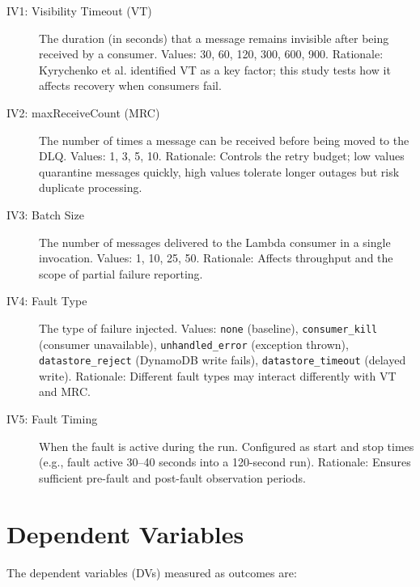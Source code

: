 \begin{description}
    \item[IV1: Visibility Timeout (VT)] The duration (in seconds) that a message remains invisible after being received by a consumer. Values: 30, 60, 120, 300, 600, 900. Rationale: Kyrychenko et al. identified VT as a key factor; this study tests how it affects recovery when consumers fail.
    
    \item[IV2: maxReceiveCount (MRC)] The number of times a message can be received before being moved to the DLQ. Values: 1, 3, 5, 10. Rationale: Controls the retry budget; low values quarantine messages quickly, high values tolerate longer outages but risk duplicate processing.
    
    \item[IV3: Batch Size] The number of messages delivered to the Lambda consumer in a single invocation. Values: 1, 10, 25, 50. Rationale: Affects throughput and the scope of partial failure reporting.
    
    \item[IV4: Fault Type] The type of failure injected. Values: \texttt{none} (baseline), \texttt{consumer\_kill} (consumer unavailable), \texttt{unhandled\_error} (exception thrown), \texttt{datastore\_reject} (DynamoDB write fails), \texttt{datastore\_timeout} (delayed write). Rationale: Different fault types may interact differently with VT and MRC.
    
    \item[IV5: Fault Timing] When the fault is active during the run. Configured as start and stop times (e.g., fault active 30–40 seconds into a 120-second run). Rationale: Ensures sufficient pre-fault and post-fault observation periods.
\end{description}

\section{Dependent Variables}

The dependent variables (DVs) measured as outcomes are:

